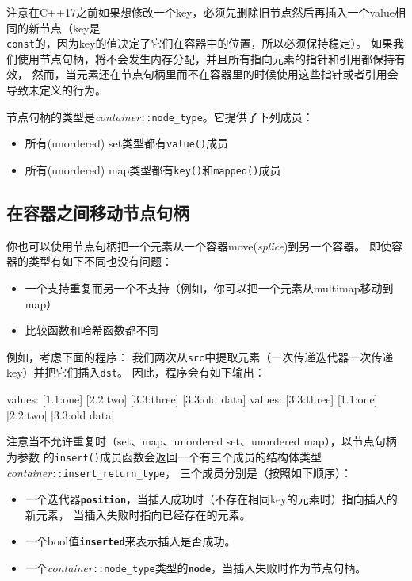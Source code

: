 注意在C++17之前如果想修改一个key，必须先删除旧节点然后再插入一个value相同的新节点（key是\\
\texttt{const}的，因为key的值决定了它们在容器中的位置，所以必须保持稳定）。
如果我们使用节点句柄，将不会发生内存分配，并且所有指向元素的指针和引用都保持有效，
然而，当元素还在节点句柄里而不在容器里的时候使用这些指针或者引用会导致未定义的行为。

节点句柄的类型是\emph{container}\texttt{::node\_type}。它提供了下列成员：
\begin{itemize}
    \item 所有(unordered) set类型都有\texttt{value()}成员
    \item 所有(unordered) map类型都有\texttt{key()}和\texttt{mapped()}成员
\end{itemize}

\subsection{在容器之间移动节点句柄}
你也可以使用节点句柄把一个元素从一个容器move(\emph{splice})到另一个容器。
即使容器的类型有如下不同也没有问题：
\begin{itemize}
    \item 一个支持重复而另一个不支持（例如，你可以把一个元素从multimap移动到map）
    \item 比较函数和哈希函数都不同
\end{itemize}
例如，考虑下面的程序：
我们两次从\texttt{src}中提取元素（一次传递迭代器一次传递key）并把它们插入\texttt{dst}。
因此，程序会有如下输出：
\begin{blacklisting}
    values:
      [1.1:one]  [2.2:two]  [3.3:three]
      [3.3:old data]
    values:
      [3.3:three]
      [1.1:one]  [2.2:two]  [3.3:old data]
\end{blacklisting}
注意当不允许重复时（set、map、unordered set、unordered map），以节点句柄为参数
的\texttt{insert()}成员函数会返回一个有三个成员的结构体类型\emph{container}\texttt{::insert\_return\_type}，
三个成员分别是（按照如下顺序）：\label{insert节点句柄}
\begin{itemize}
    \item 一个迭代器\textbf{\texttt{position}}，当插入成功时（不存在相同key的元素时）指向插入的新元素，
    当插入失败时指向已经存在的元素。
    \item 一个bool值\textbf{\texttt{inserted}}来表示插入是否成功。
    \item 一个\emph{container}\texttt{::node\_type}类型的\textbf{\texttt{node}}，当插入失败时作为节点句柄。
\end{itemize}
